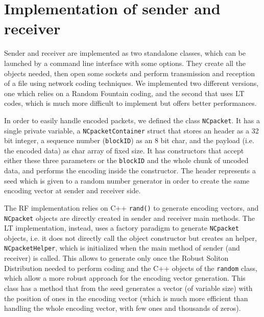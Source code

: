 \section{Implementation of sender and receiver}
\setlength{\abovecaptionskip}{10pt plus 3pt minus 2pt}

Sender and receiver are implemented as two standalone classes, which can be launched by a command line interface with some options. They create all the objects needed, then open some sockets and perform transmission and reception of a file using network coding techniques. We implemented two different versions, one which relies on a Random Fountain coding, and the second that uses LT codes, which is much more difficult to implement but offers better performances.

In order to easily handle encoded packets, we defined the class \texttt{NCpacket}. It has a single private variable, a \texttt{NCpacketContainer} struct that stores an header as a 32 bit integer, a sequence number (\texttt{blockID}) as an 8 bit char, and the payload (i.e. the encoded data) as char array of fixed size. It has constructors that accept either these three parameters or the \texttt{blockID} and the whole chunk of uncoded data, and performs the encoding inside the constructor. 
The header represents a seed which is given to a random number generator in order to create the same encoding vector at sender and receiver side. 

The RF implementation relies on C++ \texttt{rand()} to generate encoding vectors, and \texttt{NCpacket} objects are directly created in sender and receiver main methods.
The LT implementation, instead, uses a factory paradigm to generate \texttt{NCpacket} objects, i.e. it does not directly call the object constructor but creates an helper, \texttt{NCpacketHelper}, which is initialized when the main method of sender (and receiver) is called. This allows to generate only once the Robust Soliton Distribution needed to perform coding and the C++ objects of the \texttt{random} class, which allow a more robust approach for the encoding vector generation. This class has a method that from the seed generates a vector (of variable size) with the position of ones in the encoding vector (which is much more efficient than handling the whole encoding vector, with few ones and thousands of zeros).

